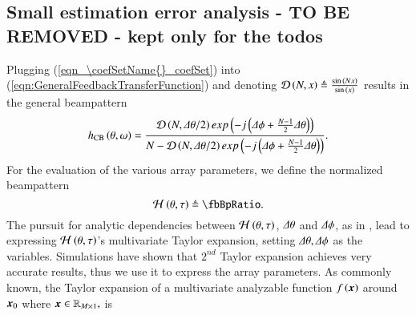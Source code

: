{
    \subsection*{Small estimation error analysis - \textbf{TO BE REMOVED - kept only for the todos}}
    \label{subsection_ArrayPerformance_TayolrAnalysis}
    Plugging (\ref{eqn_\coefSetName{}_coefSet}) into (\ref{eqn:GeneralFeedbackTransferFunction}) and denoting $\mathcal{D}\left({N,x}\right) \triangleq \frac{\sin{\left({Nx}\right)}}{\sin{\left({x}\right)}}$ results in the general \coefSetName{} beampattern 
    \begin{equation*}
        h_{\text{CB}{}}\left({\theta,\omega}\right)
        =
        \frac{
        \mathcal{D}\left({N,\Delta\theta/2}\right)exp\left({-j\left({\Delta\phi+\frac{N-1}{2}\Delta\theta}\right)}\right)
        }{
        N - \mathcal{D}\left({N,\Delta\theta/2}\right)exp\left({-j\left({\Delta\phi+\frac{N-1}{2}\Delta\theta}\right)}\right)
        }.
    \end{equation*}
    For the evaluation of the various array parameters, we define the normalized beampattern 
    \begin{equation}
        \label{eqn_arrPerformance_beamwidth_3dB}
        \Hr{\theta}{\tau}{}\triangleq\fbBpRatio.
    \end{equation}
    The pursuit for analytic dependencies between $\mathcal{H}^{}\left({\theta,\tau}\right)$, $\Delta\theta$ and $\Delta\phi$, as in \cite{VanTrees2002DetectionIV}, lead to expressing $\mathcal{H}^{}\left({\theta,\tau}\right)$'s multivariate Taylor expansion, setting $\Delta\theta,\Delta\phi$ as the variables. Simulations have shown that $2^{nd}$ Taylor expansion achieves very accurate results, thus we use it to express the array parameters. As commonly known, the Taylor expansion of a multivariate analyzable function $f\left({\boldsymbol{x}}\right)$ around $\boldsymbol{x}_{0}$ where $\boldsymbol{x} \in \mathbb{R}_{M\times1},$ is 
}
